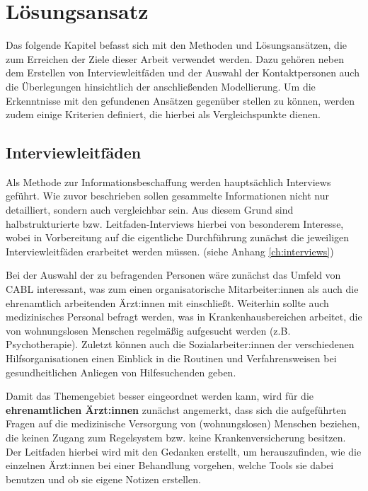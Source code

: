 \chapter{Lösungsansatz}\label{ch:approach}

Das folgende Kapitel befasst sich mit den Methoden und Lösungsansätzen, die zum Erreichen der Ziele dieser Arbeit verwendet werden. Dazu gehören neben dem Erstellen von Interviewleitfäden und der Auswahl der Kontaktpersonen auch die Überlegungen hinsichtlich der anschließenden Modellierung. Um die Erkenntnisse mit den gefundenen Ansätzen gegenüber stellen zu können, werden zudem einige Kriterien definiert, die hierbei als Vergleichspunkte dienen.


\section{Interviewleitfäden}\label{sec:guidelines}

Als Methode zur Informationsbeschaffung werden hauptsächlich Interviews geführt. Wie zuvor beschrieben sollen gesammelte Informationen nicht nur detailliert, sondern auch vergleichbar sein. Aus diesem Grund sind halbstrukturierte bzw. Leitfaden-Interviews hierbei von besonderem Interesse, wobei in Vorbereitung auf die eigentliche Durchführung zunächst die jeweiligen Interviewleitfäden erarbeitet werden müssen. (siehe Anhang \ref{ch:interviews})

Bei der Auswahl der zu befragenden Personen wäre zunächst das Umfeld von CABL interessant, was zum einen organisatorische Mitarbeiter:innen als auch die ehrenamtlich arbeitenden Ärzt:innen mit einschließt. Weiterhin sollte auch medizinisches Personal befragt werden, was in Krankenhausbereichen arbeitet, die von wohnungslosen Menschen regelmäßig aufgesucht werden (z.B. Psychotherapie). Zuletzt können auch die Sozialarbeiter:innen der verschiedenen Hilfsorganisationen einen Einblick in die Routinen und Verfahrensweisen bei gesundheitlichen Anliegen von Hilfesuchenden geben.

Damit das Themengebiet besser eingeordnet werden kann, wird für die \textbf{ehrenamtlichen Ärzt:innen} zunächst angemerkt, dass sich die aufgeführten Fragen auf die medizinische Versorgung von (wohnungslosen) Menschen beziehen, die keinen Zugang zum Regelsystem bzw. keine Krankenversicherung besitzen. Der Leitfaden hierbei wird mit den Gedanken erstellt, um herauszufinden, wie die einzelnen Ärzt:innen bei einer Behandlung vorgehen, welche Tools sie dabei benutzen und ob sie eigene Notizen erstellen.

